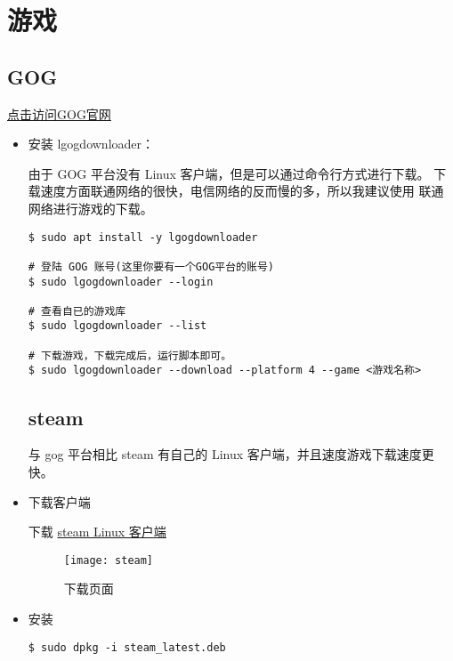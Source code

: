 \chapter{游戏}

\section{GOG} 

\href{https://www.gog.com/}{点击访问GOG官网}
\begin{itemize} 
\item 安装 lgogdownloader：

由于 GOG 平台没有 Linux 客户端，但是可以通过命令行方式进行下载。
下载速度方面联通网络的很快，电信网络的反而慢的多，所以我建议使用
联通网络进行游戏的下载。

\begin{lstlisting}
$ sudo apt install -y lgogdownloader

# 登陆 GOG 账号(这里你要有一个GOG平台的账号)
$ sudo lgogdownloader --login 

# 查看自已的游戏库
$ sudo lgogdownloader --list

# 下载游戏，下载完成后，运行脚本即可。
$ sudo lgogdownloader --download --platform 4 --game <游戏名称>
\end{lstlisting}
\newpage

\section{steam}

与 gog 平台相比 steam 有自己的 Linux 客户端，并且速度游戏下载速度更快。

\item 下载客户端

下载 \href{https://store.steampowered.com/about/}{steam Linux 客户端} 

\begin{figure}[hbt!]  
	\centering
	\texttt{[image: steam]}
	\caption{下载页面} %
	\label{fig:steam} %
\end{figure}

\item 安装
\begin{lstlisting}
$ sudo dpkg -i steam_latest.deb
\end{lstlisting}

\end{itemize}
